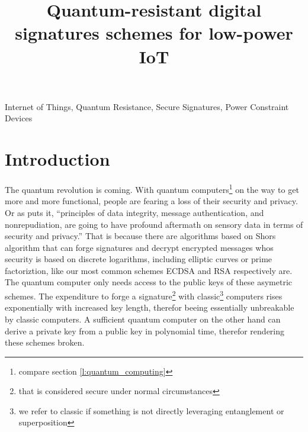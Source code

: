 \documentclass[conference]{IEEEtran}
\newcommand{\comment}[1]{}
\begin{document}
\title{Quantum-resistant digital signatures schemes for low-power IoT}

\author{
}

\maketitle

\begin{abstract}
\end{abstract}

\begin{IEEEkeywords}
Internet of Things, Quantum Resistance, Secure Signatures, Power Constraint Devices
\end{IEEEkeywords}


\section{Introduction}
\comment{ %
    „principles of data integrity, message authentication, and nonrepudiation, are going to have profound aftermath on sensory data in terms of security and privacy.“ \cite{QR_sigs}
} %

The quantum revolution is coming. With quantum computers\footnote{compare section \ref{l:quantum_computing}} on the way to get more and more functional, people are fearing a loss of their security and privacy.
Or as \cite{QR_sigs} puts it, ``principles of data integrity, message authentication, and nonrepudiation, are going to have profound aftermath on sensory data in terms of security and privacy.''
That is because there are algorithms based on Shors algorithm that can forge signatures and decrypt encrypted messages whos security is based on discrete logarithms, including elliptic curves or prime factoriztion, like our most common schemes ECDSA and RSA respectively are.
The quantum computer only needs access to the public keys of these asymetric schemes.
The expenditure to forge a signature\footnote{that is considered secure under normal circumstances 
} with classic\footnote{we refer to classic if something is not directly leveraging entanglement or superposition} computers rises exponentially with increased key length, therefor beeing essentially unbreakable by classic computers.
A sufficient quantum computer on the other hand can derive a private key from a public key in polynomial time, therefor rendering these schemes broken.
\end{document}
